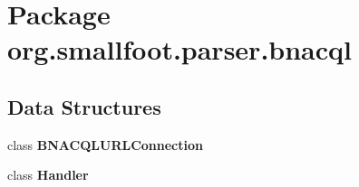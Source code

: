 \section{Package org.\+smallfoot.\+parser.\+bnacql}
\label{namespaceorg_1_1smallfoot_1_1parser_1_1bnacql}
\subsection*{Data Structures}
\begin{DoxyCompactItemize}
\item 
class {\bf B\+N\+A\+C\+Q\+L\+U\+R\+L\+Connection}
\item 
class {\bf Handler}
\end{DoxyCompactItemize}
